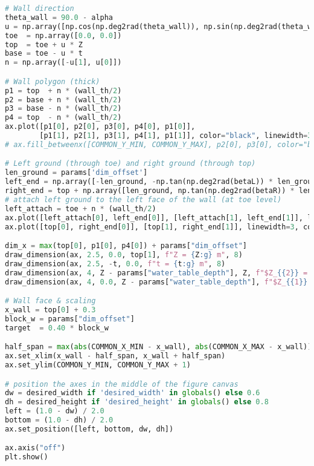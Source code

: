 \begin{lstlisting}[language=Python]
# Wall direction
theta_wall = 90.0 - alpha
u = np.array([np.cos(np.deg2rad(theta_wall)), np.sin(np.deg2rad(theta_wall))])
toe  = np.array([0.0, 0.0])
top  = toe + u * Z
base = toe - u * t
n = np.array([-u[1], u[0]])

# Wall polygon (thick)
p1 = top  + n * (wall_th/2)
p2 = base + n * (wall_th/2)
p3 = base - n * (wall_th/2)
p4 = top  - n * (wall_th/2)
ax.plot([p1[0], p2[0], p3[0], p4[0], p1[0]],
        [p1[1], p2[1], p3[1], p4[1], p1[1]], color="black", linewidth=3)
# ax.fill_betweenx([COMMON_Y_MIN, COMMON_Y_MAX], p2[0], p3[0], color="black", zorder=0)

# Left ground (through toe) and right ground (through top)
len_ground = params['dim_offset']
left_end = np.array([-len_ground, -np.tan(np.deg2rad(betaL)) * len_ground])
right_end = top + np.array([len_ground, np.tan(np.deg2rad(betaR)) * len_ground])
# attach left ground to the left face of the wall (at toe level)
left_attach = toe + n * (wall_th/2)
ax.plot([left_attach[0], left_end[0]], [left_attach[1], left_end[1]], linewidth=3, color="black")
ax.plot([top[0], right_end[0]], [top[1], right_end[1]], linewidth=3, color="black")

dim_x = max(top[0], p1[0], p4[0]) + params["dim_offset"]
draw_dimension(ax, 2.5, 0.0, top[1], f"Z = {Z:g} m", 8)
draw_dimension(ax, 2.5, -t, 0.0, f"t = {t:g} m", 8)
draw_dimension(ax, 4, Z - params["water_table_depth"], Z, f"$Z_{{2}} = {params['water_table_depth']:g}$ m", 8)
draw_dimension(ax, 4, 0.0, Z - params["water_table_depth"], f"$Z_{{1}} = {Z - params['water_table_depth']:g}$ m", 8)

# Wall face & scaling
x_wall = top[0] + 0.3
block_w = params["dim_offset"]
target  = 0.40 * block_w

half_span = max(abs(COMMON_X_MIN - x_wall), abs(COMMON_X_MAX - x_wall))
ax.set_xlim(x_wall - half_span, x_wall + half_span)
ax.set_ylim(COMMON_Y_MIN, COMMON_Y_MAX + 1)

# position the axes in the middle of the figure canvas
dw = desired_width if 'desired_width' in globals() else 0.6
dh = desired_height if 'desired_height' in globals() else 0.8
left = (1.0 - dw) / 2.0
bottom = (1.0 - dh) / 2.0
ax.set_position([left, bottom, dw, dh])

ax.axis("off")
plt.show()
\end{lstlisting}


